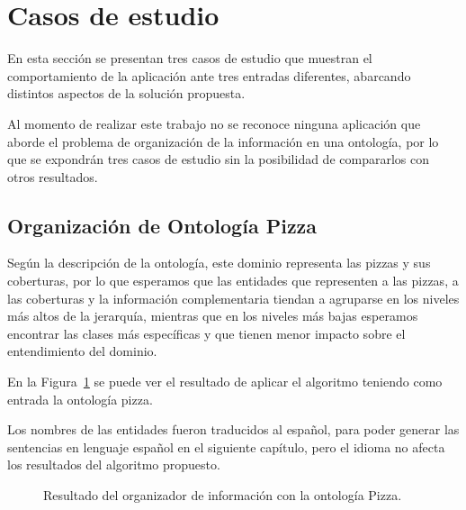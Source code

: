 \section{Casos de estudio}
En esta sección se presentan tres casos de estudio que muestran el comportamiento de la aplicación ante tres entradas diferentes, abarcando distintos aspectos de la solución propuesta.

Al momento de realizar este trabajo no se reconoce ninguna aplicación que aborde el problema de organización de la información en una ontología, por lo que se expondrán tres casos de estudio sin la posibilidad de compararlos con otros resultados.

\subsection{Organización de Ontología Pizza}
Según la descripción de la ontología, este dominio representa las pizzas y sus coberturas, por lo que esperamos que las entidades que representen a las pizzas, a las coberturas y la información complementaria tiendan a agruparse en los niveles más altos de la jerarquía, mientras que en los niveles más bajas esperamos encontrar las clases más específicas y que tienen menor impacto sobre el entendimiento del dominio.

En la Figura~\ref{fig:caso_estudio_pizza} se puede ver el resultado de aplicar el algoritmo teniendo como entrada la ontología pizza. 

Los nombres de las entidades fueron traducidos al español, para poder generar las sentencias en lenguaje español en el siguiente capítulo, pero el idioma no afecta los resultados del algoritmo propuesto.

\begin{figure}
\begin{multicols}{2}
\begin{figure}[H]
\end{figure}

\begin{figure}[H]
\end{figure}

\end{multicols}
\caption{Resultado del organizador de información con la ontología Pizza.}
\label{fig:caso_estudio_pizza}
\end{figure}

